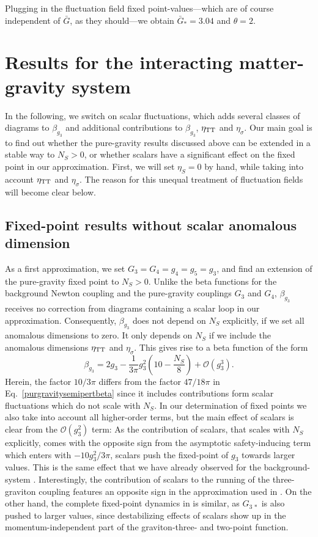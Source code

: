 \documentclass[11pt]{book} %
\newcommand{\be}{\begin{equation}}
\newcommand{\ee}{\end{equation}}
\begin{document}
Plugging in the fluctuation field fixed point-values---which are of course independent
of $\bar{G}$, as they should---we obtain $\bar{G}_{\ast} = 3.04$ and $\theta=2$.


\section{Results for the interacting matter-gravity system}
In the following, we switch on scalar fluctuations,
which adds several classes of diagrams to $\beta_{g_3}$ and additional contributions to
$\beta_{g_3}$, $\eta_{\rm TT}$ and $\eta_{\sigma}$.
Our main goal is to find out whether the pure-gravity results discussed above can be
extended in a stable way to $N_S>0$,
or whether scalars have a significant effect on the fixed point in our approximation.
First, we will set $\eta_S=0$ by hand, while taking into account $\eta_{\rm TT}$ and $\eta_{\sigma}$.
The reason for this unequal treatment of fluctuation fields will become clear below.

%
\subsection{Fixed-point results without scalar anomalous dimension}
%
As a first approximation, we set $G_3=G_4=g_4=g_5=g_3$,
and find an extension of the pure-gravity fixed point to $N_S>0$.
Unlike the beta functions for the background Newton coupling and the pure-gravity
couplings $G_3$ and $G_4$, $\beta_{g_3}$ receives no correction from diagrams containing
a scalar loop  in our approximation.
Consequently, $\beta_{g_3}$ does not depend on $N_S$ explicitly, if we set all anomalous dimensions to zero.
It only depends on $N_S$ if we include the anomalous dimensions $\eta_{\rm TT}$ and $\eta_{\sigma}$.
This gives rise to a beta function of the form
\be
\beta_{g_3}= 2g_3 -\frac{1}{3\pi}g_3^2\left(10-\frac{N_S}{8}\right)
+\mathcal{O}(g_3^3).
\label{norma}
\ee
Herein, the factor $10/3\pi$ differs from the  factor $47/18\pi$ in
Eq.~\eqref{purgravitysemipertbeta} since it includes contributions form scalar fluctuations
which do not scale with $N_S$.
In our determination of fixed points we also take into account all higher-order terms,
but the main effect of scalars is clear from the $\mathcal{O}(g_3^2)$ term:
As the contribution of scalars, that scales with $N_S$ explicitly,
comes with the opposite sign from the asymptotic safety-inducing term which enters with $-10g_3^2/3\pi$,
scalars push the fixed-point of $g_3$ towards larger values.
This is the same effect that we have already observed for the background-system \cite{Dona:2013qba}.
Interestingly, the contribution of scalars to the running of the three-graviton coupling features
an opposite sign in the approximation used in \cite{Meibohm:2015twa}.
On the other hand, the complete fixed-point dynamics in \cite{Meibohm:2015twa} is similar,
as $G_{3\,\ast}$ is also pushed to larger values,
since destabilizing effects of scalars show up in the momentum-independent part of the
graviton-three- and two-point function.
\end{document}
